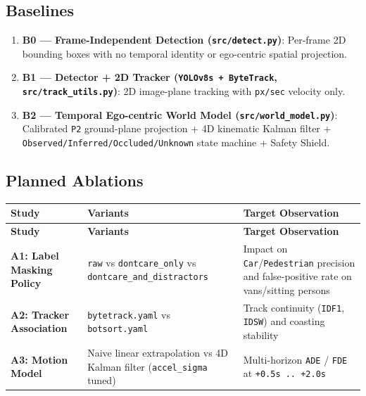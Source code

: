 \documentclass[10.5pt,a4paper]{article}
\begin{document}
\subsection{Baselines}
\begin{enumerate}[leftmargin=1.8em,itemsep=2pt]
\item \textbf{B0 --- Frame-Independent Detection (\texttt{src/\allowbreak{}detect.\allowbreak{}py})}: Per-frame 2D bounding boxes with no temporal identity or ego-centric spatial projection.
\item \textbf{B1 --- Detector + 2D Tracker (\texttt{YOLOv8s + ByteTrack}, \texttt{src/\allowbreak{}track\_\allowbreak{}utils.\allowbreak{}py})}: 2D image-plane tracking with \texttt{px/\allowbreak{}sec} velocity only.
\item \textbf{B2 --- Temporal Ego-centric World Model (\texttt{src/\allowbreak{}world\_\allowbreak{}model.\allowbreak{}py})}: Calibrated \texttt{P2} ground-plane projection + 4D kinematic Kalman filter + \texttt{Observed/\allowbreak{}Inferred/\allowbreak{}Occluded/\allowbreak{}Unknown} state machine + Safety Shield.
\end{enumerate}

\subsection{Planned Ablations}

\begin{footnotesize}
\setlength{\tabcolsep}{4pt}
\setlength{\LTleft}{0pt}\setlength{\LTright}{0pt}
\begin{longtable}{>{\raggedright\arraybackslash}p{} >{\raggedright\arraybackslash}p{} >{\raggedright\arraybackslash}p{}}
\toprule
\textbf{Study} & \textbf{Variants} & \textbf{Target Observation} \\
\midrule
\endfirsthead
\toprule
\textbf{Study} & \textbf{Variants} & \textbf{Target Observation} \\
\midrule
\endhead
\bottomrule
\endfoot
\textbf{A1: Label Masking Policy} & \texttt{raw} vs \texttt{dontcare\_\allowbreak{}only} vs \texttt{dontcare\_\allowbreak{}and\_\allowbreak{}distractors} & Impact on \texttt{Car}/\texttt{Pedestrian} precision and false-positive rate on vans/sitting persons \\
\textbf{A2: Tracker Association} & \texttt{bytetrack.\allowbreak{}yaml} vs \texttt{botsort.\allowbreak{}yaml} & Track continuity (\texttt{IDF1}, \texttt{IDSW}) and coasting stability \\
\textbf{A3: Motion Model} & Naive linear extrapolation vs 4D Kalman filter (\texttt{accel\_\allowbreak{}sigma} tuned) & Multi-horizon \texttt{ADE} / \texttt{FDE} at \texttt{+0.\allowbreak{}5s .\allowbreak{}.\allowbreak{} +2.\allowbreak{}0s} \\
\end{longtable}
\end{footnotesize}
\end{document}

